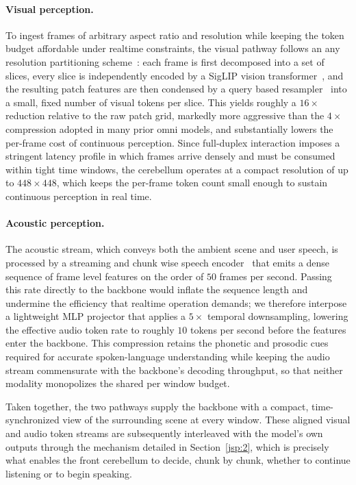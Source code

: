 \paragraph{Visual perception.} To ingest frames of arbitrary aspect ratio and resolution while keeping the token budget affordable under realtime constraints, the visual pathway follows an any resolution partitioning scheme~\cite{llavauhd}: each frame is first decomposed into a set of slices, every slice is independently encoded by a SigLIP vision transformer~\cite{siglip}, and the resulting patch features are then condensed by a query based resampler~\cite{minicpmv} into a small, fixed number of visual tokens per slice. This yields roughly a $16\times$ reduction relative to the raw patch grid, markedly more aggressive than the $4\times$ compression adopted in many prior omni models, and substantially lowers the per-frame cost of continuous perception. Since full-duplex interaction imposes a stringent latency profile in which frames arrive densely and must be consumed within tight time windows, the cerebellum operates at a compact resolution of up to $448\times448$, which keeps the per-frame token count small enough to sustain continuous perception in real time.


\vspace{-0.5cm}

\paragraph{Acoustic perception.} The acoustic stream, which conveys both the ambient scene and user speech, is processed by a streaming and chunk wise speech encoder~\cite{whisper} that emits a dense sequence of frame level features on the order of $50$ frames per second. Passing this rate directly to the backbone would inflate the sequence length and undermine the efficiency that realtime operation demands; we therefore interpose a lightweight MLP projector that applies a $5\times$ temporal downsampling, lowering the effective audio token rate to roughly $10$ tokens per second before the features enter the backbone. This compression retains the phonetic and prosodic cues required for accurate spoken-language understanding while keeping the audio stream commensurate with the backbone's decoding throughput, so that neither modality monopolizes the shared per window budget.


Taken together, the two pathways supply the backbone with a compact, time-synchronized view of the surrounding scene at every window. These aligned visual and audio token streams are subsequently interleaved with the model's own outputs through the mechanism detailed in Section~\ref{jsp:2}, which is precisely what enables the front cerebellum to decide, chunk by chunk, whether to continue listening or to begin speaking.

